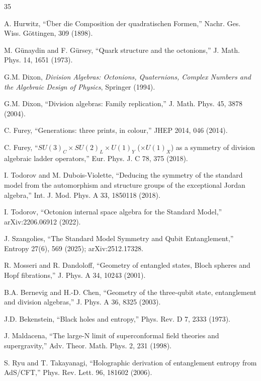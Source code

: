 \documentclass[11pt]{article}
\begin{document}
\begin{thebibliography}{35}

 A. Hurwitz, ``\"Uber die Composition der quadratischen Formen,'' Nachr. Ges. Wiss. G\"ottingen, 309 (1898).

 M. G\"unaydin and F. G\"ursey, ``Quark structure and the octonions,'' J. Math. Phys. 14, 1651 (1973).

 G.M. Dixon, \emph{Division Algebras: Octonions, Quaternions, Complex Numbers and the Algebraic Design of Physics}, Springer (1994).

 G.M. Dixon, ``Division algebras: Family replication,'' J. Math. Phys. 45, 3878 (2004).

 C. Furey, ``Generations: three prints, in colour,'' JHEP 2014, 046 (2014).

 C. Furey, ``$SU(3)_C \times SU(2)_L \times U(1)_Y$ ($\times U(1)_X$) as a symmetry of division algebraic ladder operators,'' Eur. Phys. J. C 78, 375 (2018).

 I. Todorov and M. Dubois-Violette, ``Deducing the symmetry of the standard model from the automorphism and structure groups of the exceptional Jordan algebra,'' Int. J. Mod. Phys. A 33, 1850118 (2018).

 I. Todorov, ``Octonion internal space algebra for the Standard Model,'' arXiv:2206.06912 (2022).

 J. Szangolies, ``The Standard Model Symmetry and Qubit Entanglement,'' Entropy 27(6), 569 (2025); arXiv:2512.17328.

 R. Mosseri and R. Dandoloff, ``Geometry of entangled states, Bloch spheres and Hopf fibrations,'' J. Phys. A 34, 10243 (2001).

 B.A. Bernevig and H.-D. Chen, ``Geometry of the three-qubit state, entanglement and division algebras,'' J. Phys. A 36, 8325 (2003).

 J.D. Bekenstein, ``Black holes and entropy,'' Phys. Rev. D 7, 2333 (1973).

 J. Maldacena, ``The large-N limit of superconformal field theories and supergravity,'' Adv. Theor. Math. Phys. 2, 231 (1998).

 S. Ryu and T. Takayanagi, ``Holographic derivation of entanglement entropy from AdS/CFT,'' Phys. Rev. Lett. 96, 181602 (2006).


\end{thebibliography}
\end{document}
